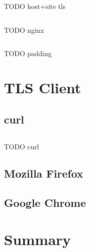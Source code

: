 \blindtext

\begin{listing}[ht]
\inputminted{bash}{snippets/host_tls.bash}
\caption{TODO host+site tls}
\end{listing}

\blindtext

\begin{listing}[ht]
\inputminted{nginx}{snippets/nginx}
\caption{TODO nginx}
\end{listing}

\blindtext

\begin{listing}[ht]
\inputminted{bash}{snippets/padding.bash}
\caption{TODO padding}
\end{listing}

\blindtext











\section{TLS Client}

\blindtext


\subsection{curl}

\blindtext

\begin{listing}[ht]
\inputminted{nginx}{snippets/curl.bash}
\caption{TODO curl}
\end{listing}

\blindtext


\subsection{Mozilla Firefox}

\blindtext


\subsection{Google Chrome}

\blindtext










\section{Summary}

\blindtext
